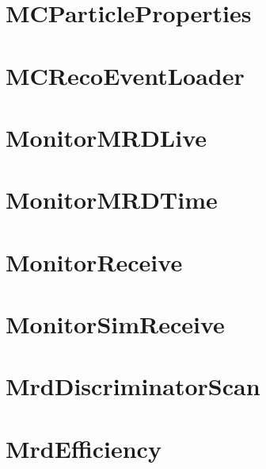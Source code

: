 \documentclass[twoside]{book}
\begin{document}
\chapter{M\-C\-Particle\-Properties}
\label{md_UserTools_MCParticleProperties_README}
\hypertarget{md_UserTools_MCParticleProperties_README}{}

\chapter{M\-C\-Reco\-Event\-Loader}
\label{md_UserTools_MCRecoEventLoader_README}
\hypertarget{md_UserTools_MCRecoEventLoader_README}{}

\chapter{Monitor\-M\-R\-D\-Live}
\label{md_UserTools_MonitorMRDLive_README}
\hypertarget{md_UserTools_MonitorMRDLive_README}{}

\chapter{Monitor\-M\-R\-D\-Time}
\label{md_UserTools_MonitorMRDTime_README}
\hypertarget{md_UserTools_MonitorMRDTime_README}{}

\chapter{Monitor\-Receive}
\label{md_UserTools_MonitorReceive_README}
\hypertarget{md_UserTools_MonitorReceive_README}{}

\chapter{Monitor\-Sim\-Receive}
\label{md_UserTools_MonitorSimReceive_README}
\hypertarget{md_UserTools_MonitorSimReceive_README}{}

\chapter{Mrd\-Discriminator\-Scan}
\label{md_UserTools_MrdDiscriminatorScan_README}
\hypertarget{md_UserTools_MrdDiscriminatorScan_README}{}

\chapter{Mrd\-Efficiency}
\label{md_UserTools_MrdDistributions_README}
\hypertarget{md_UserTools_MrdDistributions_README}{}

\end{document}
